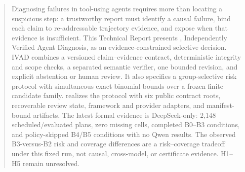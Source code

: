 \begin{abstract}
Diagnosing failures in tool-using agents requires more than locating a suspicious
step: a trustworthy report must identify a causal failure, bind each claim to
re-addressable trajectory evidence, and expose when that evidence is
insufficient. This Technical Report presents \method, Independently Verified
Agent Diagnosis, as an evidence-constrained selective decision. IVAD combines a
versioned claim--evidence contract, deterministic integrity and scope checks, a
separated semantic verifier, one bounded revision, and explicit abstention or
human review. It also specifies a group-selective risk protocol with
simultaneous exact-binomial bounds over a frozen finite candidate family.
\system realizes the protocol with six public contract roots, recoverable review
state, framework and provider adapters, and manifest-bound artifacts. The latest
formal evidence is DeepSeek-only: 2,148 scheduled/evaluated plans, zero missing
cells, completed B0--B3 conditions, and policy-skipped B4/B5 conditions with no
Qwen results. The observed B3-versus-B2 risk and coverage differences are a
risk--coverage tradeoff under this fixed run, not causal, cross-model, or
certificate evidence. H1--H5 remain unresolved.
\end{abstract}
